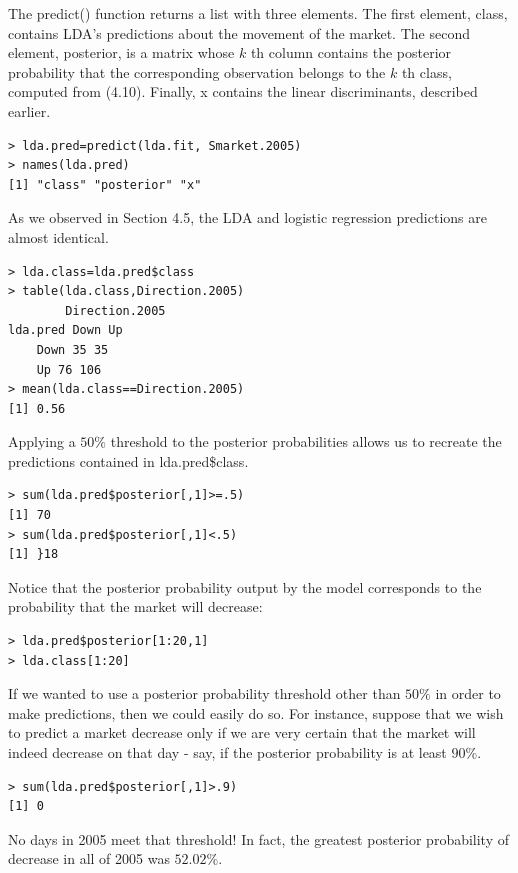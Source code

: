 \documentclass[10pt]{article}
\begin{document}
The predict() function returns a list with three elements. The first element, class, contains LDA's predictions about the movement of the market. The second element, posterior, is a matrix whose $k$ th column contains the posterior probability that the corresponding observation belongs to the $k$ th class, computed from (4.10). Finally, x contains the linear discriminants, described earlier.

\begin{verbatim}
> lda.pred=predict(lda.fit, Smarket.2005)
> names(lda.pred)
[1] "class" "posterior" "x"
\end{verbatim}

As we observed in Section 4.5, the LDA and logistic regression predictions are almost identical.

\begin{verbatim}
> lda.class=lda.pred$class
> table(lda.class,Direction.2005)
        Direction.2005
lda.pred Down Up
    Down 35 35
    Up 76 106
> mean(lda.class==Direction.2005)
[1] 0.56
\end{verbatim}

Applying a $50 \%$ threshold to the posterior probabilities allows us to recreate the predictions contained in lda.pred\$class.

\begin{verbatim}
> sum(lda.pred$posterior[,1]>=.5)
[1] 70
> sum(lda.pred$posterior[,1]<.5)
[1] }18
\end{verbatim}

Notice that the posterior probability output by the model corresponds to the probability that the market will decrease:

\begin{verbatim}
> lda.pred$posterior[1:20,1]
> lda.class[1:20]
\end{verbatim}

If we wanted to use a posterior probability threshold other than $50 \%$ in order to make predictions, then we could easily do so. For instance, suppose that we wish to predict a market decrease only if we are very certain that the market will indeed decrease on that day - say, if the posterior probability is at least $90 \%$.

\begin{verbatim}
> sum(lda.pred$posterior[,1]>.9)
[1] 0
\end{verbatim}

No days in 2005 meet that threshold! In fact, the greatest posterior probability of decrease in all of 2005 was $52.02 \%$.
\end{document}
